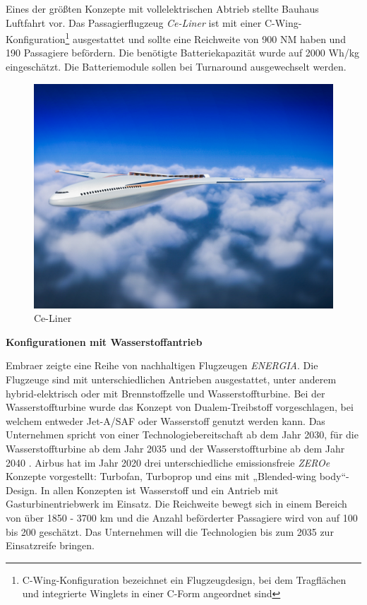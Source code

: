 Eines der größten Konzepte mit vollelektrischen Abtrieb stellte Bauhaus Luftfahrt vor. 
Das Passagierflugzeug \textit{Ce-Liner} \cite{BauhausLuftfahrt} ist mit einer 
C-Wing-Konfiguration\footnote{C-Wing-Konfiguration bezeichnet ein Flugzeugdesign, bei dem Tragflächen und integrierte Winglets in einer C-Form angeordnet sind}
ausgestattet und sollte eine Reichweite von 900 NM haben und 190 Passagiere befördern. 
Die benötigte Batteriekapazität wurde auf 2000 Wh/kg eingeschätzt. 
Die Batteriemodule sollen bei Turnaround ausgewechselt werden.
\begin{figure}[h]
	\centering
	\includegraphics[width=0.6\linewidth]{Bilder/NASA.jpg}
	\caption[NASA]{Ce-Liner \cite{NASA_N3X_2025} }
	\label{NASA_konfig}
\end{figure}

\textbf{Konfigurationen mit Wasserstoffantrieb}

Embraer zeigte eine Reihe von nachhaltigen Flugzeugen \textit{ENERGIA}. 
Die Flugzeuge sind mit unterschiedlichen Antrieben ausgestattet, 
unter anderem hybrid-elektrisch oder mit Brennstoffzelle und Wasserstoffturbine. 
Bei der Wasserstoffturbine wurde das Konzept von Dualem-Treibstoff vorgeschlagen, 
bei welchem entweder Jet-A/SAF oder Wasserstoff genutzt werden kann. 
Das Unternehmen spricht von einer Technologiebereitschaft ab dem Jahr 2030, 
für die Wasserstoffturbine ab dem Jahr 2035 und der Wasserstoffturbine ab dem Jahr 2040 \cite{embraer_energia_2021}. %
%
Airbus \cite{airbus_zea_concepts} hat im Jahr 2020 drei unterschiedliche 
emissionsfreie \textit{ZEROe} Konzepte vorgestellt: Turbofan, Turboprop und eins mit „Blended-wing body“-Design.
In allen Konzepten ist Wasserstoff und ein Antrieb mit Gasturbinentriebwerk im Einsatz. 
Die Reichweite bewegt sich in einem Bereich von über 1850 - 3700 km 
und die Anzahl beförderter Passagiere wird von auf 100 bis 200 geschätzt. 
Das Unternehmen will die Technologien bis zum 2035 zur Einsatzreife bringen.

